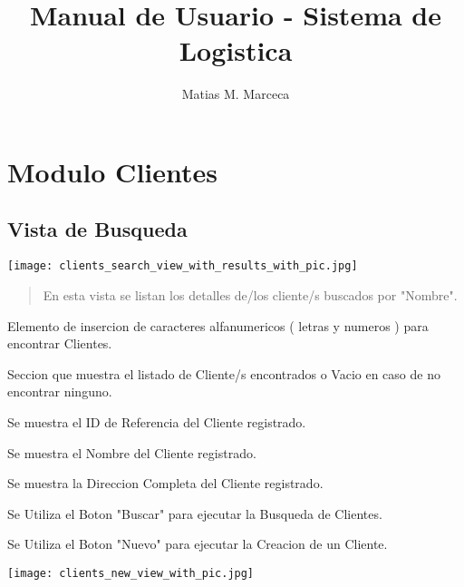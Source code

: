 \documentclass[
10pt, %
a4paper, %
oneside, %
headinclude,footinclude, %
BCOR5mm, %
]{scrartcl}
\title{Manual de Usuario - Sistema de Logistica}
\author{Matias M. Marceca}
\date{}
\begin{document}
\maketitle
\tableofcontents
\pagebreak

\section{Modulo Clientes}
\subsection{Vista de Busqueda}

 \begin{flushleft}
     \texttt{[image: clients\_search\_view\_with\_results\_with\_pic.jpg]}
 \end{flushleft}

 \begin{quotation}
   En esta vista se listan los detalles de/los cliente/s buscados por "Nombre".
 \end{quotation}
 \begin{enumerated}
   \item  Elemento de insercion de caracteres alfanumericos
     ( letras y numeros ) para encontrar Clientes.
   \item  Seccion que muestra el listado de Cliente/s encontrados
      o Vacio en caso de no encontrar ninguno.

   \begin{enumerated}
     \item Se muestra el ID de Referencia del Cliente registrado.
     \item Se muestra el Nombre del Cliente registrado.
     \item Se muestra la Direccion Completa del Cliente registrado.
    \end{enumerated}

   \item Se Utiliza el Boton "Buscar" para ejecutar la Busqueda de Clientes.
   \item Se Utiliza el Boton "Nuevo" para ejecutar la Creacion de un Cliente.
  \end{enumerated}

\pagebreak

 \begin{flushleft}
     \texttt{[image: clients\_new\_view\_with\_pic.jpg]}
 \end{flushleft}
\end{document}
